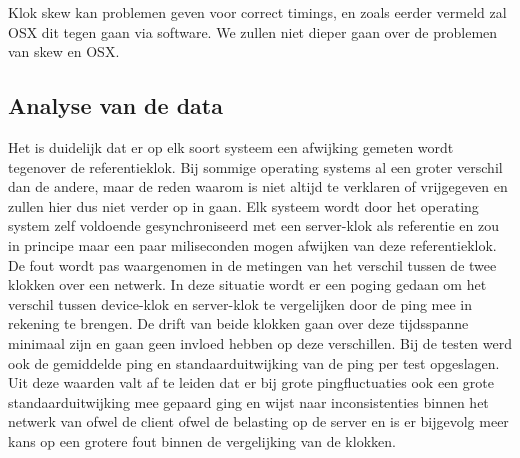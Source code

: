 Klok skew kan problemen geven voor correct timings, en zoals eerder vermeld zal OSX dit tegen gaan via software. We zullen niet dieper gaan over de problemen van skew en OSX. 


\subsection{Analyse van de data}
Het is duidelijk dat er op elk soort systeem een afwijking gemeten wordt tegenover de referentieklok. Bij sommige operating systems al een groter verschil dan de andere, maar de reden waarom is niet altijd te verklaren of vrijgegeven en zullen hier dus niet verder op in gaan. Elk systeem wordt door het operating system zelf voldoende gesynchroniseerd met een server-klok als referentie en zou in principe maar een paar miliseconden mogen afwijken van deze referentieklok. De fout wordt pas waargenomen in de metingen van het verschil tussen de twee klokken over een netwerk. In deze situatie wordt er een poging gedaan om het verschil tussen device-klok en server-klok te vergelijken door de ping mee in rekening te brengen. De drift van beide klokken gaan over deze tijdsspanne minimaal zijn en gaan geen invloed hebben op deze verschillen. Bij de testen werd ook de gemiddelde ping en standaarduitwijking van de ping per test opgeslagen. Uit deze waarden valt af te leiden dat er bij grote pingfluctuaties ook een grote standaarduitwijking mee gepaard ging en wijst naar inconsistenties binnen het netwerk van ofwel de client ofwel de belasting op de server en is er bijgevolg meer kans op een grotere fout binnen de vergelijking van de klokken. 

